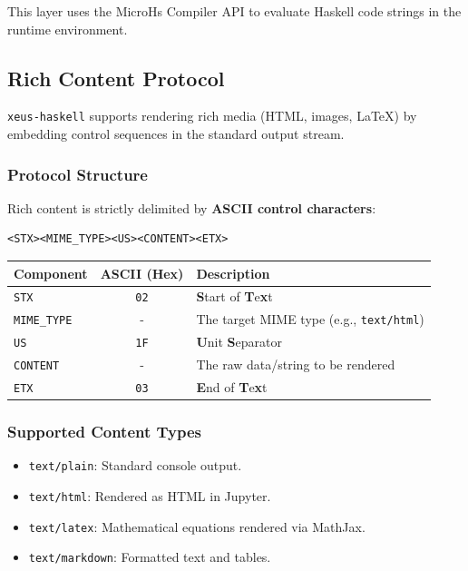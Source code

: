 \documentclass[11pt]{article}
\begin{document}
This layer uses the MicroHs Compiler API to evaluate Haskell code strings in the runtime environment.
\subsection{Rich Content Protocol}


\texttt{xeus-haskell} supports rendering rich media (HTML, images, LaTeX) by embedding control sequences in the standard output stream.
\subsubsection{Protocol Structure}


Rich content is strictly delimited by \textbf{ASCII control characters}:
\begin{verbatim}
<STX><MIME_TYPE><US><CONTENT><ETX>
\end{verbatim}


\begin{center}
\begin{tabular}{|l|c|p{8cm}|}
\hline
\textbf{Component} & \textbf{ASCII (Hex)} & \textbf{Description} \\
\hline
\texttt{STX} & \texttt{02} & \textbf{S}tart of \textbf{T}e\textbf{x}t \\
\hline
\texttt{MIME\_TYPE} & - & The target MIME type (e.g., \texttt{text/html}) \\
\hline
\texttt{US} & \texttt{1F} & \textbf{U}nit \textbf{S}eparator \\
\hline
\texttt{CONTENT} & - & The raw data/string to be rendered \\
\hline
\texttt{ETX} & \texttt{03} & \textbf{E}nd of \textbf{T}e\textbf{x}t \\
\hline
\end{tabular}
\end{center}
\subsubsection{Supported Content Types}


\begin{itemize}
\item \texttt{text/plain}: Standard console output.
\item \texttt{text/html}: Rendered as HTML in Jupyter.
\item \texttt{text/latex}: Mathematical equations rendered via MathJax.
\item \texttt{text/markdown}: Formatted text and tables.
\end{itemize}
\end{document}
